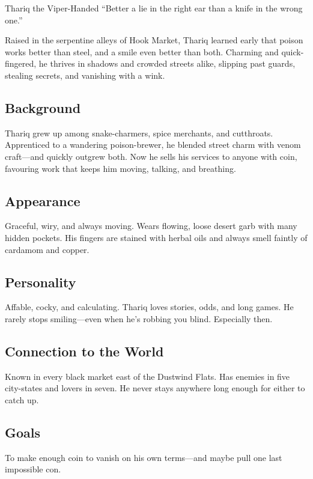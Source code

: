 \newpage
\begin{WyrdCharacterSheet}
    {Thariq the Viper-Handed}
    {“Better a lie in the right ear than a knife in the wrong one.”}
    \label{pc:thariq-viper}

    Raised in the serpentine alleys of Hook Market, Thariq learned early that poison works better than steel, and a smile even better than both. Charming and quick-fingered, he thrives in shadows and crowded streets alike, slipping past guards, stealing secrets, and vanishing with a wink.

    \subsection{Background}
    Thariq grew up among snake-charmers, spice merchants, and cutthroats. Apprenticed to a wandering poison-brewer, he blended street charm with venom craft—and quickly outgrew both. Now he sells his services to anyone with coin, favouring work that keeps him moving, talking, and breathing.

    \subsection{Appearance}
    Graceful, wiry, and always moving. Wears flowing, loose desert garb with many hidden pockets. His fingers are stained with herbal oils and always smell faintly of cardamom and copper.

    \subsection{Personality}
    Affable, cocky, and calculating. Thariq loves stories, odds, and long games. He rarely stops smiling—even when he’s robbing you blind. Especially then.

    \subsection{Connection to the World}
    Known in every black market east of the Dustwind Flats. Has enemies in five city-states and lovers in seven. He never stays anywhere long enough for either to catch up.

    \subsection{Goals}
    To make enough coin to vanish on his own terms—and maybe pull one last impossible con.


\end{WyrdCharacterSheet}
